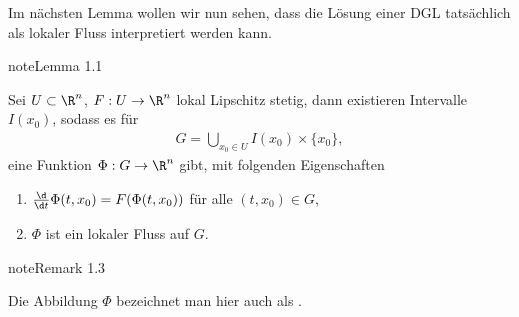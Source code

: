 \documentclass[letterpaper,10pt,english]{jupyterBook}
\begin{document}
Im nächsten Lemma wollen wir nun sehen, dass die Lösung einer DGL tatsächlich als lokaler Fluss interpretiert werden kann.
\label{ode/fluesse:lemma-3}
\begin{sphinxadmonition}{note}{Lemma 1.1}



Sei \(U\subset\R^n\), \(F:U \rightarrow \R^n\) lokal Lipschitz stetig, dann existieren Intervalle \(I(x_0)\), sodass es für
\begin{equation*}
\begin{split}G = \bigcup_{x_0\in U} I(x_0)\times\{x_0\},\end{split}
\end{equation*}
eine Funktion \(\Phi:G\rightarrow \R^n\) gibt, mit folgenden Eigenschaften
\begin{enumerate}
%
\item {} 
\(\frac{\d}{\d t} \Phi(t, x_0) = F(\Phi(t, x_0))\) für alle \((t,x_0)\in G\),

\item {} 
\(\Phi\) ist ein lokaler Fluss auf \(G\).

\end{enumerate}
\end{sphinxadmonition}
\label{ode/fluesse:remark-4}
\begin{sphinxadmonition}{note}{Remark 1.3}



Die Abbildung \(\Phi\) bezeichnet man hier auch als .
\end{sphinxadmonition}
\end{document}
